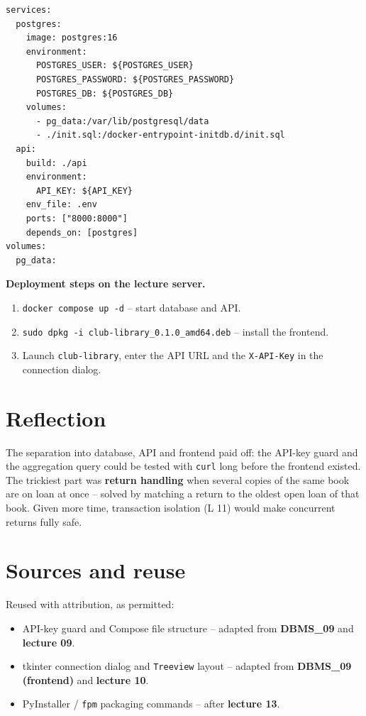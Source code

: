 \documentclass[11pt,a4paper]{article}
\begin{document}
\begin{lstlisting}[caption={docker-compose.yml (excerpt, after L 09)}]
services:
  postgres:
    image: postgres:16
    environment:
      POSTGRES_USER: ${POSTGRES_USER}
      POSTGRES_PASSWORD: ${POSTGRES_PASSWORD}
      POSTGRES_DB: ${POSTGRES_DB}
    volumes:
      - pg_data:/var/lib/postgresql/data
      - ./init.sql:/docker-entrypoint-initdb.d/init.sql
  api:
    build: ./api
    environment:
      API_KEY: ${API_KEY}
    env_file: .env
    ports: ["8000:8000"]
    depends_on: [postgres]
volumes:
  pg_data:
\end{lstlisting}

\textbf{Deployment steps on the lecture server.}
\begin{enumerate}[leftmargin=1.6em, topsep=2pt]
  \item \texttt{docker compose up -d} -- start database and API.
  \item \texttt{sudo dpkg -i club-library\_0.1.0\_amd64.deb} -- install the
        frontend.
  \item Launch \texttt{club-library}, enter the API URL and the
        \texttt{X-API-Key} in the connection dialog.
\end{enumerate}

\section{Reflection}

The separation into database, API and frontend paid off: the API-key guard and
the aggregation query could be tested with \texttt{curl} long before the
frontend existed. The trickiest part was \textbf{return handling} when several
copies of the same book are on loan at once -- solved by matching a return to
the oldest open loan of that book. Given more time, transaction isolation
(L 11) would make concurrent returns fully safe.

\section*{Sources and reuse}

Reused with attribution, as permitted:
\begin{itemize}[leftmargin=1.4em, topsep=2pt]
  \item API-key guard and Compose file structure -- adapted from
        \textbf{DBMS\_09} and \textbf{lecture 09}.
  \item tkinter connection dialog and \texttt{Treeview} layout -- adapted from
        \textbf{DBMS\_09 (frontend)} and \textbf{lecture 10}.
  \item PyInstaller / \texttt{fpm} packaging commands -- after \textbf{lecture
        13}.
\end{itemize}
\end{document}
